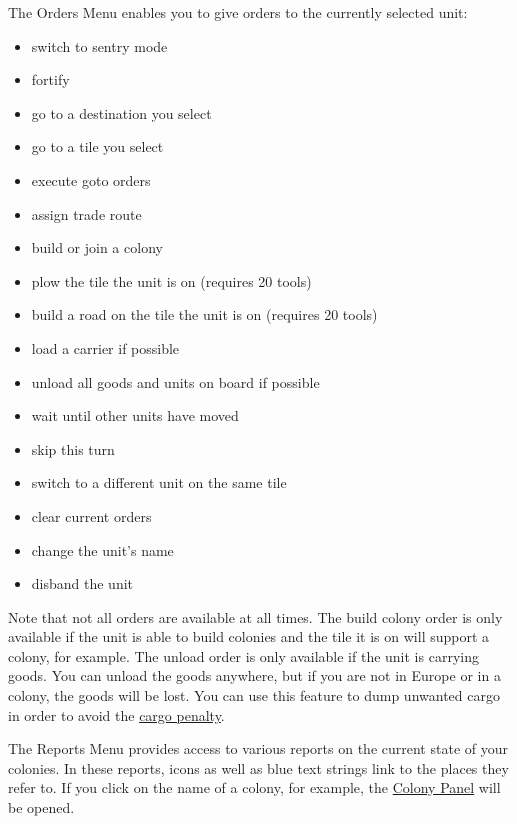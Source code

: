 \documentclass[12pt]{book}
\begin{document}
The \hypertarget{orders menu}{Orders Menu} enables you to give orders
to the currently selected unit:

\begin{itemize}
\item switch to sentry mode
\item fortify
\item go to a destination you select
\item go to a tile you select
\item execute goto orders
\item assign trade route
\item build or join a colony
\item plow the tile the unit is on (requires 20 tools)
\item build a road on the tile the unit is on (requires 20 tools)
\item load a carrier if possible
\item unload all goods and units on board if possible
\item wait until other units have moved
\item skip this turn
\item switch to a different unit on the same tile
\item clear current orders
\item change the unit's name
\item disband the unit
\end{itemize}

Note that not all orders are available at all times. The build colony
order is only available if the unit is able to build colonies and the
tile it is on will support a colony, for example. The unload order is
only available if the unit is carrying goods. You can unload the goods
anywhere, but if you are not in Europe or in a colony, the goods will
be lost. You can use this feature to dump unwanted cargo in order to avoid the \hyperlink{Cargo Penalty}{cargo
  penalty}.

The \hypertarget{reports menu}{Reports Menu} provides access to
various reports on the current state of your colonies. In these
reports, icons as well as blue text strings link to the places they
refer to. If you click on the name of a colony, for example, the
\hyperlink{colony panel}{Colony Panel} will be opened.
\end{document}

